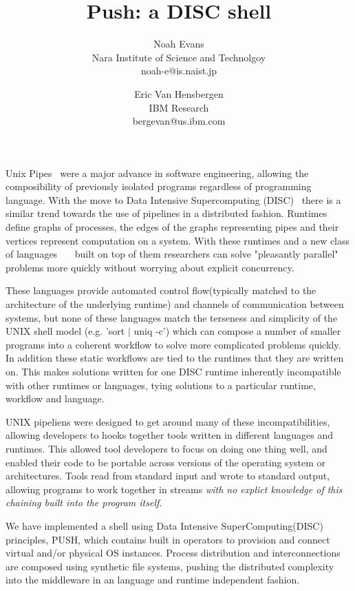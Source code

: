 \documentclass[11pt, letterpaper]{article}
\title{Push: a DISC shell}
\author{Noah Evans \\Nara Institute of Science and Technolgoy \\noah-e@is.naist.jp  \and Eric Van Hensbergen \\IBM Research \\bergevan@us.ibm.com}
\date{}
\begin{document}
\maketitle

Unix Pipes~\cite{mcilroy1964paf} were a major advance in software engineering, 
allowing the composibility of previously isolated programs regardless of 
programming language. 
With the move to 
Data Intensive Supercomputing (DISC)~\cite{bryant2007dis} 
there is a similar trend towards the use of pipelines in a distributed fashion. 
Runtimes ~\cite{dean2008msd}~\cite{bialecki:hfr}~\cite{isard2007ddd} define 
graphs of processes, the edges of the graphs representing 
pipes and their vertices represent computation on a system.  
With these runtimes and 
a new class of languages~\cite{pike2005idp}~\cite{yu2008dsg}~\cite{olston2008pln} 
built on top of them researchers can solve "pleasantly parallel" 
problems more quickly without worrying about explicit concurrency.

These languages provide automated control flow(typically matched to the 
architecture of the underlying runtime) and channels of communication between 
systems, but none of these languages match the terseness and simplicity of 
the UNIX shell model (e.g. 'sort $|$ uniq -c') which can compose a number of 
smaller programs into a coherent workflow to solve more complicated problems 
quickly. In addition these static workflows are tied to the runtimes that they 
are written on. This makes solutions written for one DISC runtime inherently 
incompatible with other runtimes or languages, tying solutions to a particular 
runtime, workflow and language.

UNIX pipeliens were designed to get around many of these incompatibilities, 
allowing developers to hooks together tools written in different languages and
runtimes.  This allowed tool developers to focus on doing one thing well, and
enabled their code to be portable across versions of the operating system or
architectures.  
Tools read from standard input and wrote to standard output, allowing programs 
to work together in streams \emph{with no explict knowledge of this chaining
built into the program itself}.

We have implemented a shell using Data Intensive SuperComputing(DISC) 
principles, PUSH, which contains built in operators to provision and connect 
virtual and/or physical OS instances.  Process distribution and interconnections 
are composed using synthetic file systems, pushing the distributed complexity 
into the middleware in an language and runtime independent fashion.
\end{document}
